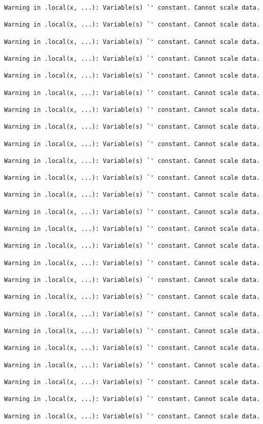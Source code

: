 \documentclass[
  letterpaper,
  DIV=11,
  numbers=noendperiod]{scrartcl}
\begin{document}
\begin{verbatim}
Warning in .local(x, ...): Variable(s) `' constant. Cannot scale data.

Warning in .local(x, ...): Variable(s) `' constant. Cannot scale data.

Warning in .local(x, ...): Variable(s) `' constant. Cannot scale data.

Warning in .local(x, ...): Variable(s) `' constant. Cannot scale data.

Warning in .local(x, ...): Variable(s) `' constant. Cannot scale data.

Warning in .local(x, ...): Variable(s) `' constant. Cannot scale data.

Warning in .local(x, ...): Variable(s) `' constant. Cannot scale data.

Warning in .local(x, ...): Variable(s) `' constant. Cannot scale data.

Warning in .local(x, ...): Variable(s) `' constant. Cannot scale data.

Warning in .local(x, ...): Variable(s) `' constant. Cannot scale data.

Warning in .local(x, ...): Variable(s) `' constant. Cannot scale data.

Warning in .local(x, ...): Variable(s) `' constant. Cannot scale data.

Warning in .local(x, ...): Variable(s) `' constant. Cannot scale data.

Warning in .local(x, ...): Variable(s) `' constant. Cannot scale data.

Warning in .local(x, ...): Variable(s) `' constant. Cannot scale data.

Warning in .local(x, ...): Variable(s) `' constant. Cannot scale data.

Warning in .local(x, ...): Variable(s) `' constant. Cannot scale data.

Warning in .local(x, ...): Variable(s) `' constant. Cannot scale data.

Warning in .local(x, ...): Variable(s) `' constant. Cannot scale data.

Warning in .local(x, ...): Variable(s) `' constant. Cannot scale data.

Warning in .local(x, ...): Variable(s) `' constant. Cannot scale data.

Warning in .local(x, ...): Variable(s) `' constant. Cannot scale data.

Warning in .local(x, ...): Variable(s) `' constant. Cannot scale data.

Warning in .local(x, ...): Variable(s) `' constant. Cannot scale data.

Warning in .local(x, ...): Variable(s) `' constant. Cannot scale data.
\end{verbatim}
\end{document}
